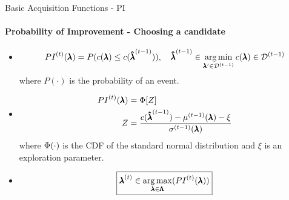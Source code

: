 \begin{frame}[c]{Basic Acquisition Functions - PI}
\framesubtitle{Probability of Improvement - Choosing a candidate}
\pause {}
\begin{itemize}
    \item[]
        \[
            \iter{PI}(\conf) = P(\cost(\conf) \leq \cost(\incumbent[\bocount-1])), \quad\incumbent[\bocount-1]\in\argmin_{\conf'\in\iter[\bocount-1]{\dataset}}\boobs\in\iter[\bocount-1]{\dataset}
        \]
    \newline
    where $P(\cdot)$ is the probability of an event.
    \pause
    \item[]
    \begin{align*}
        \iter{PI}(\conf) &= \cdf[Z] \\
        Z &= \dfrac{\cost(\incumbent[\bocount-1]) - \iter[\bocount-1]{\mean}(\conf) - \xi}{\iter[\bocount-1]{\stddev}(\conf)}
    \end{align*}
    \newline
    where $\cdf(\cdot)$ is the CDF of the standard normal distribution and $\xi$ is an exploration parameter.
    \pause
    \item[] \[\boxed{\bonextsample \in \argmax_{\conf\in\pcs}(\iter{PI}(\conf))}\]
\end{itemize}
\end{frame}
